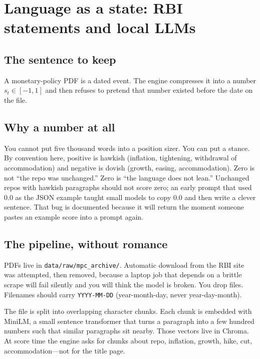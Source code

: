 \documentclass[11pt,a4paper]{article}
\begin{document}
\section{Language as a state: RBI statements and local LLMs}
\label{ch:nlp}

\subsection{The sentence to keep}

A monetary-policy PDF is a dated event. The engine compresses it into a number $s_t\in[-1,1]$ and then refuses to pretend that number existed before the date on the file.

\subsection{Why a number at all}

You cannot put five thousand words into a position sizer. You can put a stance. By convention here, positive is hawkish (inflation, tightening, withdrawal of accommodation) and negative is dovish (growth, easing, accommodation). Zero is not ``the repo was unchanged.'' Zero is ``the language does not lean.'' Unchanged repos with hawkish paragraphs should not score zero; an early prompt that used $0.0$ as the JSON example taught small models to copy $0.0$ and then write a clever sentence. That bug is documented because it will return the moment someone pastes an example score into a prompt again.

\subsection{The pipeline, without romance}

PDFs live in \texttt{data/raw/mpc\_archive/}. Automatic download from the RBI site was attempted, then removed, because a laptop job that depends on a brittle scrape will fail silently and you will think the model is broken. You drop files. Filenames should carry \texttt{YYYY-MM-DD} (year-month-day, never year-day-month).

The file is split into overlapping character chunks. Each chunk is embedded with MiniLM, a small sentence transformer that turns a paragraph into a few hundred numbers such that similar paragraphs sit nearby. Those vectors live in Chroma. At score time the engine asks for chunks about repo, inflation, growth, hike, cut, accommodation---not for the title page.
\end{document}
